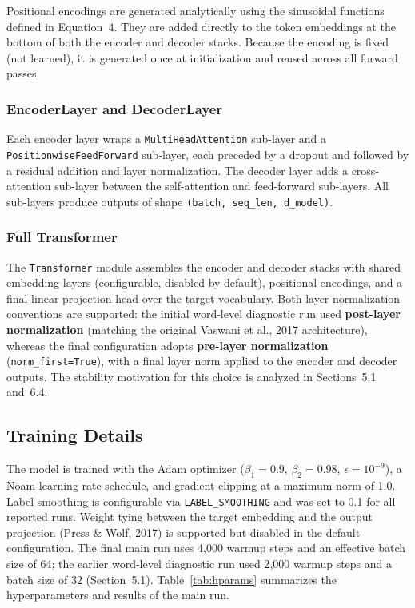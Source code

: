 \documentclass[10pt]{article}
\begin{document}
Positional encodings are generated analytically using the sinusoidal functions defined in Equation~4. They are added directly to the token embeddings at the bottom of both the encoder and decoder stacks. Because the encoding is fixed (not learned), it is generated once at initialization and reused across all forward passes.

\subsubsection{EncoderLayer and DecoderLayer}

Each encoder layer wraps a \texttt{MultiHeadAttention} sub-layer and a \texttt{PositionwiseFeedForward} sub-layer, each preceded by a dropout and followed by a residual addition and layer normalization. The decoder layer adds a cross-attention sub-layer between the self-attention and feed-forward sub-layers. All sub-layers produce outputs of shape \texttt{(batch, seq\_len, d\_model)}.

\subsubsection{Full Transformer}

The \texttt{Transformer} module assembles the encoder and decoder stacks with shared embedding layers (configurable, disabled by default), positional encodings, and a final linear projection head over the target vocabulary. Both layer-normalization conventions are supported: the initial word-level diagnostic run used \textbf{post-layer normalization} (matching the original Vaswani et al., 2017 architecture), whereas the final configuration adopts \textbf{pre-layer normalization} (\texttt{norm\_first=True}), with a final layer norm applied to the encoder and decoder outputs. The stability motivation for this choice is analyzed in Sections~5.1 and~6.4.

\subsection{Training Details}

The model is trained with the Adam optimizer ($\beta_1 = 0.9$, $\beta_2 = 0.98$, $\epsilon = 10^{-9}$), a Noam learning rate schedule, and gradient clipping at a maximum norm of 1.0. Label smoothing is configurable via \texttt{LABEL\_SMOOTHING} and was set to 0.1 for all reported runs. Weight tying between the target embedding and the output projection (Press \& Wolf, 2017) is supported but disabled in the default configuration. The final main run uses 4{,}000 warmup steps and an effective batch size of 64; the earlier word-level diagnostic run used 2{,}000 warmup steps and a batch size of 32 (Section~5.1). Table~\ref{tab:hparams} summarizes the hyperparameters and results of the main run.
\end{document}
